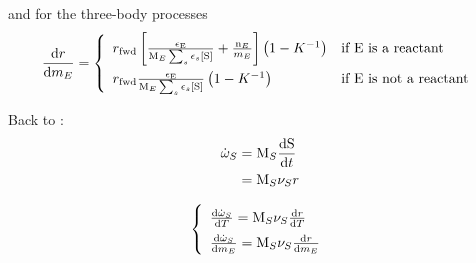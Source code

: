 and for the three-body processes
\begin{equation}
\renewcommand{\arraystretch}{1.5}
\doverdm[E]{\rate} = \left\{\begin{array}{ll}
                        \ratef \left[\frac{\epsilon_{\ce{E}}}{\Mm[E]\threeBody} + \frac{\scoefabs[E]}{\mass[E]} \right] \left(1 - \Eqconst^{-1}\right)
                                                & \text{if \ce{E} is a reactant} \\
                        \ratef \frac{\epsilon_{\ce{E}}}{\Mm[E]\threeBody}  \left(1 - \Eqconst^{-1}\right)
                                                & \text{if \ce{E} is not a reactant} \\
                      \end{array}\right.
\end{equation}

Back to \mdot:
\begin{equation}
\begin{split}
\mdot[S] &= \Mm[S] \doverdt{\ce{S}} \\
         &= \Mm[S] \scoef[S]\rate
\end{split}
\end{equation}

\begin{equation}
\renewcommand{\arraystretch}{1.5}
\left\{\begin{array}{l}
\doverdT{\mdot[S]} = \Mm[S] \scoef[S]\doverdT{\rate}\\
\doverdm[E]{\mdot[S]} = \Mm[S] \scoef[S]\doverdm[E]{\rate}
\end{array}\right.
\end{equation}

